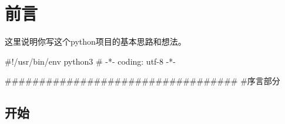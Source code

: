 \documentclass[11pt,oneside]{book}
\begin{document}
\frontmatter

\author{作者}
\titleLC

\chapter*{前言}
\begin{common-format}
这里说明你写这个python项目的基本思路和想法。


\begin{python}
#!/usr/bin/env python3
# -*- coding: utf-8 -*-

##################################
#序言部分
\end{python}


\end{common-format}


\setcounter{tocdepth}{2}
\tableofcontents

\begin{common-format}
\mainmatter

\chapter{开始}






\end{common-format}
\end{document}
